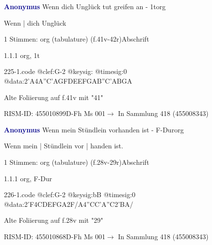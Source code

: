 \documentclass[twocolumn, 12pt]{book}
\begin{document}
\par \vspace{16pt} \textcolor{darkblue}{\textbf{Anonymus  }}\hfillplus{\textbf{[225]}}\newline Wenn dich Unglück tut greifen an - 1t\newline org
\par \begin{itshape}[f.41v, at left:] Wenn | dich Unglück\end{itshape} 
\par \textcolor{darkblue}{}  1 Stimmen: org (tabulature)  (f.41v-42r)\newline Abschrift
\par 1.1.1  org, 1t  
\begin{filecontents*}{225-1.code}
@clef:G-2
@keysig:
@timesig:0
@data:2'A4A''C'AGFDEEFGAB''C'ABGA
\end{filecontents*}
\newline %
\par Alte Foliierung auf f.41v mit "41"
\par RISM-ID: 455010899\newline D-Fh  Ms 001\newline $\rightarrow$ In Sammlung 418 (455008343)
      
\par \vspace{16pt} \textcolor{darkblue}{\textbf{Anonymus  }}\hfillplus{\textbf{[226]}}\newline Wenn mein Stündlein vorhanden ist - F-Dur\newline org
\par \begin{itshape}[f.28v, at left:] Wenn mein | Stündlein vor | handen ist.\end{itshape} 
\par \textcolor{darkblue}{}  1 Stimmen: org (tabulature)  (f.28v-29r)\newline Abschrift
\par 1.1.1  org, F-Dur  
\begin{filecontents*}{226-1.code}
@clef:G-2
@keysig:bB
@timesig:0
@data:2'F4CDEFGA2F/A4''CC'A''C2'BA/
\end{filecontents*}
\newline %
\par Alte Foliierung auf f.28v mit "29"
\par RISM-ID: 455010868\newline D-Fh  Ms 001\newline $\rightarrow$ In Sammlung 418 (455008343)
      
\end{document}

